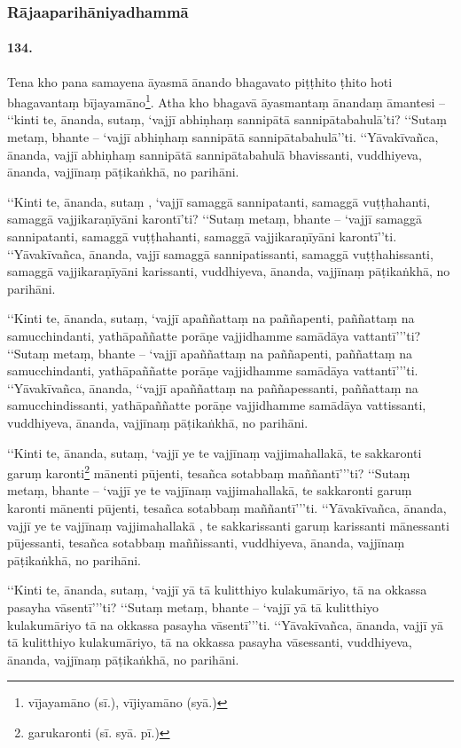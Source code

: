 \subsubsection{Rājaaparihāniyadhammā}

\paragraph{134.} Tena kho pana samayena āyasmā ānando bhagavato piṭṭhito ṭhito hoti bhagavantaṃ bījayamāno\footnote{vījayamāno (sī.), vījiyamāno (syā.)}. Atha kho bhagavā āyasmantaṃ ānandaṃ āmantesi – ‘‘kinti te, ānanda, sutaṃ, ‘vajjī abhiṇhaṃ sannipātā sannipātabahulā’ti? ‘‘Sutaṃ metaṃ, bhante – ‘vajjī abhiṇhaṃ sannipātā sannipātabahulā’’ti. ‘‘Yāvakīvañca, ānanda, vajjī abhiṇhaṃ sannipātā sannipātabahulā bhavissanti, vuddhiyeva, ānanda, vajjīnaṃ pāṭikaṅkhā, no parihāni.

‘‘Kinti te, ānanda, sutaṃ , ‘vajjī samaggā sannipatanti, samaggā vuṭṭhahanti, samaggā vajjikaraṇīyāni karontī’ti? ‘‘Sutaṃ metaṃ, bhante – ‘vajjī samaggā sannipatanti, samaggā vuṭṭhahanti, samaggā vajjikaraṇīyāni karontī’’ti. ‘‘Yāvakīvañca, ānanda, vajjī samaggā sannipatissanti, samaggā vuṭṭhahissanti, samaggā vajjikaraṇīyāni karissanti, vuddhiyeva, ānanda, vajjīnaṃ pāṭikaṅkhā, no parihāni.

‘‘Kinti te, ānanda, sutaṃ, ‘vajjī apaññattaṃ na paññapenti, paññattaṃ na samucchindanti, yathāpaññatte porāṇe vajjidhamme samādāya vattantī’’’ti? ‘‘Sutaṃ metaṃ, bhante – ‘vajjī apaññattaṃ na paññapenti, paññattaṃ na samucchindanti, yathāpaññatte porāṇe vajjidhamme samādāya vattantī’’’ti. ‘‘Yāvakīvañca, ānanda, ‘‘vajjī apaññattaṃ na paññapessanti, paññattaṃ na samucchindissanti, yathāpaññatte porāṇe vajjidhamme samādāya vattissanti, vuddhiyeva, ānanda, vajjīnaṃ pāṭikaṅkhā, no parihāni.

‘‘Kinti te, ānanda, sutaṃ, ‘vajjī ye te vajjīnaṃ vajjimahallakā, te sakkaronti garuṃ karonti\footnote{garukaronti (sī. syā. pī.)} mānenti pūjenti, tesañca sotabbaṃ maññantī’’’ti? ‘‘Sutaṃ metaṃ, bhante – ‘vajjī ye te vajjīnaṃ vajjimahallakā, te sakkaronti garuṃ karonti mānenti pūjenti, tesañca sotabbaṃ maññantī’’’ti. ‘‘Yāvakīvañca, ānanda, vajjī ye te vajjīnaṃ vajjimahallakā , te sakkarissanti garuṃ karissanti mānessanti pūjessanti, tesañca sotabbaṃ maññissanti, vuddhiyeva, ānanda, vajjīnaṃ pāṭikaṅkhā, no parihāni.

‘‘Kinti te, ānanda, sutaṃ, ‘vajjī yā tā kulitthiyo kulakumāriyo, tā na okkassa pasayha vāsentī’’’ti? ‘‘Sutaṃ metaṃ, bhante – ‘vajjī yā tā kulitthiyo kulakumāriyo tā na okkassa pasayha vāsentī’’’ti. ‘‘Yāvakīvañca, ānanda, vajjī yā tā kulitthiyo kulakumāriyo, tā na okkassa pasayha vāsessanti, vuddhiyeva, ānanda, vajjīnaṃ pāṭikaṅkhā, no parihāni.

